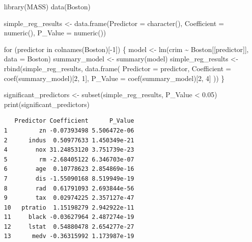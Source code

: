 \documentclass[
]{article}
\newenvironment{Shaded}{\begin{snugshade}}{\end{snugshade}}
\newcommand{\AttributeTok}[1]{\textcolor[rgb]{0.40,0.45,0.13}{#1}}
\newcommand{\ControlFlowTok}[1]{\textcolor[rgb]{0.00,0.23,0.31}{#1}}
\newcommand{\DecValTok}[1]{\textcolor[rgb]{0.68,0.00,0.00}{#1}}
\newcommand{\FloatTok}[1]{\textcolor[rgb]{0.68,0.00,0.00}{#1}}
\newcommand{\FunctionTok}[1]{\textcolor[rgb]{0.28,0.35,0.67}{#1}}
\newcommand{\NormalTok}[1]{\textcolor[rgb]{0.00,0.23,0.31}{#1}}
\newcommand{\OtherTok}[1]{\textcolor[rgb]{0.00,0.23,0.31}{#1}}
\newcommand{\SpecialCharTok}[1]{\textcolor[rgb]{0.37,0.37,0.37}{#1}}
\begin{document}
\begin{Shaded}
\begin{Highlighting}[]
\FunctionTok{library}\NormalTok{(MASS)}
\FunctionTok{data}\NormalTok{(Boston)}

\NormalTok{simple\_reg\_results }\OtherTok{\textless{}{-}} \FunctionTok{data.frame}\NormalTok{(}\AttributeTok{Predictor =} \FunctionTok{character}\NormalTok{(), }\AttributeTok{Coefficient =} \FunctionTok{numeric}\NormalTok{(), }\AttributeTok{P\_Value =} \FunctionTok{numeric}\NormalTok{())}

\ControlFlowTok{for}\NormalTok{ (predictor }\ControlFlowTok{in} \FunctionTok{colnames}\NormalTok{(Boston)[}\SpecialCharTok{{-}}\DecValTok{1}\NormalTok{]) \{}
\NormalTok{  model }\OtherTok{\textless{}{-}} \FunctionTok{lm}\NormalTok{(crim }\SpecialCharTok{\textasciitilde{}}\NormalTok{ Boston[[predictor]], }\AttributeTok{data =}\NormalTok{ Boston)}
\NormalTok{  summary\_model }\OtherTok{\textless{}{-}} \FunctionTok{summary}\NormalTok{(model)}
\NormalTok{  simple\_reg\_results }\OtherTok{\textless{}{-}} \FunctionTok{rbind}\NormalTok{(simple\_reg\_results, }\FunctionTok{data.frame}\NormalTok{(}
    \AttributeTok{Predictor =}\NormalTok{ predictor,}
    \AttributeTok{Coefficient =} \FunctionTok{coef}\NormalTok{(summary\_model)[}\DecValTok{2}\NormalTok{, }\DecValTok{1}\NormalTok{],}
    \AttributeTok{P\_Value =} \FunctionTok{coef}\NormalTok{(summary\_model)[}\DecValTok{2}\NormalTok{, }\DecValTok{4}\NormalTok{]}
\NormalTok{  ))}
\NormalTok{\}}

\NormalTok{significant\_predictors }\OtherTok{\textless{}{-}} \FunctionTok{subset}\NormalTok{(simple\_reg\_results, P\_Value }\SpecialCharTok{\textless{}} \FloatTok{0.05}\NormalTok{)}
\FunctionTok{print}\NormalTok{(significant\_predictors)}
\end{Highlighting}
\end{Shaded}

\begin{verbatim}
   Predictor Coefficient      P_Value
1         zn -0.07393498 5.506472e-06
2      indus  0.50977633 1.450349e-21
4        nox 31.24853120 3.751739e-23
5         rm -2.68405122 6.346703e-07
6        age  0.10778623 2.854869e-16
7        dis -1.55090168 8.519949e-19
8        rad  0.61791093 2.693844e-56
9        tax  0.02974225 2.357127e-47
10   ptratio  1.15198279 2.942922e-11
11     black -0.03627964 2.487274e-19
12     lstat  0.54880478 2.654277e-27
13      medv -0.36315992 1.173987e-19
\end{verbatim}
\end{document}
